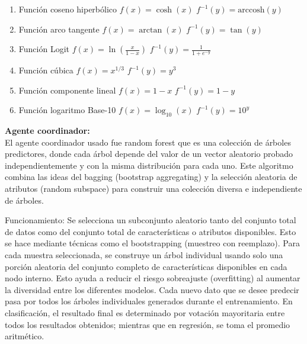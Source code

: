 \begin{enumerate}
        
            \item  Función coseno hiperbólico
            \( f(x) = \cosh(x) \)  
            \( f^{-1}(y) = \text{arccosh}(y) \)
        
            \item  Función arco tangente
            \( f(x) = \arctan(x) \)  
            \( f^{-1}(y) = \tan(y) \)
        
            \item  Función Logit
            \( f(x) = \ln\left(\frac{x}{1 - x}\right) \)  
            \( f^{-1}(y) = \frac{1}{1 + e^{-y}} \)
        
            \item  Función cúbica
            \( f(x) = x^{1/3} \)  
            \( f^{-1}(y) = y^3 \)
        
            \item Función componente lineal  
            \( f(x) = 1 - x \)  
            \( f^{-1}(y) = 1 - y \)
        
            \item  Función logaritmo Base-10   
            \( f(x) = \log_{10}(x) \)  
            \( f^{-1}(y) = 10^y \)

    \end{enumerate}


    \textbf{Agente coordinador:} \\

    El agente coordinador usado fue random forest que es una colección de árboles predictores, donde cada árbol depende del valor de un vector aleatorio probado
     independientemente y con la misma distribución para cada uno. Este algoritmo combina las ideas del bagging (bootstrap aggregating) y la selección aleatoria 
     de atributos (random subspace) para construir una colección diversa e independiente de árboles. 
     
    Funcionamiento: Se selecciona un subconjunto aleatorio tanto del conjunto total de datos como del conjunto total de características o atributos disponibles. 
    Esto se hace mediante técnicas como el bootstrapping (muestreo con reemplazo). Para cada muestra seleccionada, se construye un árbol individual usando solo 
    una porción aleatoria del conjunto completo de características disponibles en cada nodo interno. Esto ayuda a reducir el riesgo sobreajuste (overfitting) al 
    aumentar la diversidad entre los diferentes modelos. Cada nuevo dato que se desee predecir pasa por todos los árboles individuales generados durante el 
    entrenamiento. En clasificación, el resultado final es determinado por votación mayoritaria entre todos los resultados obtenidos; mientras que en regresión, 
    se toma el promedio aritmético. \\

